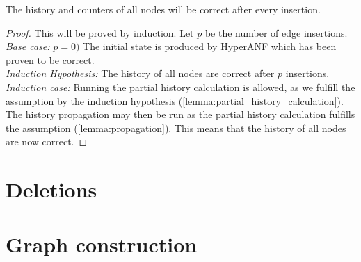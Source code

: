\begin{theorem}
The history and counters of all nodes will be correct after every insertion.\\

\begin{proof} This will be proved by induction. Let $p$ be the number of edge insertions.\\

\noindent\textit{Base case:} $p = 0)$ The initial state is produced by HyperANF which has been proven to be correct.\\

\noindent\textit{Induction Hypothesis:} The history of all nodes are correct after $p$ insertions.\\

\iffalse
Given that the history of all nodes are correct after insertion $p$, they will be correct after insertion $p+1$.\\
\fi

\noindent\textit{Induction case:}
Running the partial history calculation is allowed, as we fulfill the assumption by the induction hypothesis (\ref{lemma:partial_history_calculation}). The history propagation may then be run as the partial history calculation fulfills the assumption (\ref{lemma:propagation}). This means that the history of all nodes are now correct. 

\end{proof}
\end{theorem}

\section{Deletions}

\section{Graph construction}


